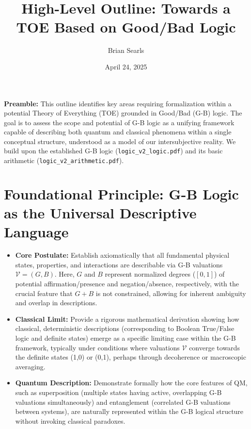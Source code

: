 \documentclass{article}
\title{High-Level Outline: Towards a TOE Based on Good/Bad Logic}
\author{Brian Searls} %
\date{April 24, 2025} %
\begin{document}
\maketitle

\noindent\textbf{Preamble:} This outline identifies key areas requiring formalization within a potential Theory of Everything (TOE) grounded in Good/Bad (G-B) logic. The goal is to assess the scope and potential of G-B logic as a unifying framework capable of describing both quantum and classical phenomena within a single conceptual structure, understood as a model of our intersubjective reality. We build upon the established G-B logic (\texttt{logic\_v2\_logic.pdf}) and its basic arithmetic (\texttt{logic\_v2\_arithmetic.pdf}).

\vspace{\baselineskip} %

\section{Foundational Principle: G-B Logic as the Universal Descriptive Language}

\begin{itemize}
    \item \textbf{Core Postulate:} Establish axiomatically that all fundamental physical states, properties, and interactions are describable via G-B valuations $\mathcal{V} = (G, B)$. Here, $G$ and $B$ represent normalized degrees ($[0,1]$) of potential affirmation/presence and negation/absence, respectively, with the crucial feature that $G+B$ is not constrained, allowing for inherent ambiguity and overlap in descriptions.

    \item \textbf{Classical Limit:} Provide a rigorous mathematical derivation showing how classical, deterministic descriptions (corresponding to Boolean True/False logic and definite states) emerge as a specific limiting case within the G-B framework, typically under conditions where valuations $\mathcal{V}$ converge towards the definite states (1,0) or (0,1), perhaps through decoherence or macroscopic averaging.

    \item \textbf{Quantum Description:} Demonstrate formally how the core features of QM, such as superposition (multiple states having active, overlapping G-B valuations simultaneously) and entanglement (correlated G-B valuations between systems), are naturally represented within the G-B logical structure without invoking classical paradoxes.
\end{itemize}
\end{document}
